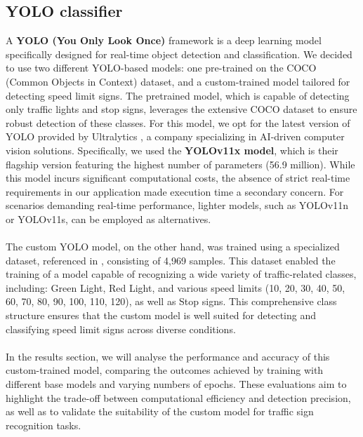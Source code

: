 \documentclass[10pt,conference,a4paper]{IEEEtran}
\begin{document}
\subsection{YOLO classifier}\label{ch:yolo}
A \textbf{YOLO (You Only Look Once)} framework is a deep learning model specifically designed for real-time object detection and classification. We decided to use two different YOLO-based models: one pre-trained on the COCO (Common Objects in Context) dataset, and a custom-trained model tailored for detecting speed limit signs. The pretrained model, which is capable of detecting only traffic lights and stop signs, leverages the extensive COCO dataset to ensure robust detection of these classes. For this model, we opt for the latest version of YOLO provided by Ultralytics \cite{yolodoc}, a company specializing in AI-driven computer vision solutions. Specifically, we used the \textbf{YOLOv11x model}, which is their flagship version featuring the highest number of parameters (56.9 million). While this model incurs significant computational costs, the absence of strict real-time requirements in our application made execution time a secondary concern. For scenarios demanding real-time performance, lighter models, such as YOLOv11n or YOLOv11s, can be employed as alternatives.\\\\
The custom YOLO model, on the other hand, was trained using a specialized dataset, referenced in \cite{dataset}, consisting of 4,969 samples. This dataset enabled the training of a model capable of recognizing a wide variety of traffic-related classes, including: Green Light, Red Light, and various speed limits (10, 20, 30, 40, 50, 60, 70, 80, 90, 100, 110, 120), as well as Stop signs. This comprehensive class structure ensures that the custom model is well suited for detecting and classifying speed limit signs across diverse conditions.\\\\
In the results section, we will analyse the performance and accuracy of this custom-trained model, comparing the outcomes achieved by training with different base models and varying numbers of epochs. These evaluations aim to highlight the trade-off between computational efficiency and detection precision, as well as to validate the suitability of the custom model for traffic sign recognition tasks.
\end{document}
